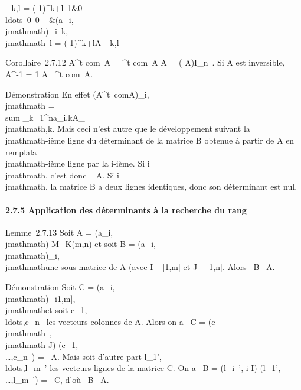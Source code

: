\documentclass[]{article}
\begin{document}
\Delta_k,l = (-1)^k+l\left
\matrix\,1&0\\ldots~0
\cr \matrix\,0
\cr \⋮~
&(a_i,\\jmathmath)_i\neq~k,\\jmathmath\mathrel\neq~l\right
 = (-1)^k+lA_ k,l

Corollaire~2.7.12 A^t com~A =
^t com~A A =
( A)I_n~.
Si A est inversible, A^-1 = 1 \over
{} A~
^t com~A.

Démonstration En effet (A^t\
comA)_i,\\jmathmath =\ \\sum
 _k=1^na_i,kA_\\jmathmath,k. Mais ceci n'est
autre que le développement suivant la \\jmathmath-ième ligne du déterminant de la
matrice B obtenue à partir de A en rempla\ccant la
\\jmathmath-ième ligne par la i-ième. Si i = \\jmathmath, c'est donc
\mathrm{det}~ A. Si
i\neq~\\jmathmath, la matrice B a deux lignes identiques,
donc son déterminant est nul.

\paragraph{2.7.5 Application des déterminants à la recherche du rang}

Lemme~2.7.13 Soit A = (a_i,\\jmathmath) \in M_K(m,n) et soit B =
(a_i,\\jmathmath)_i\inI,\\jmathmath\inJ une sous-matrice de A (avec I \subset~
{[}1,m{]} et J \subset~ {[}1,n{]}. Alors
\mathrmrg~B
\leq\mathrmrg~A.

Démonstration Soit C = (a_i,\\jmathmath)_i\in{[}1,m{]},\\jmathmath\inJ et soit
c_1,\\ldots,c_n~
les vecteurs colonnes de A. Alors on a
\mathrmrg~C
= \mathrmrg(c_\\jmathmath~, \\jmathmath
\in J)
\leq\mathrmrg(c_1,\\\ldots,c_n~)
= \mathrmrg~A. Mais soit
d'autre part
l_1',\\ldots,l_m~'
les vecteurs lignes de la matrice C. On a
\mathrmrg~B
= \mathrmrg(l_i~',
i \in I)
\leq\mathrmrg(l_1',\\\ldots,l_m~')
= \mathrmrg~C, d'où
\mathrmrg~B
\leq\mathrmrg~A.
\end{document}

